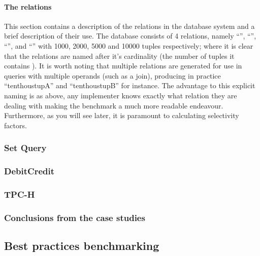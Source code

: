 \paragraph{The relations} This section contains a description of the relations in
the database system and a brief description of their use. The database consists
of 4 relations, namely ``'', ``'',
``'', and ``'' with 1000, 2000, 5000
and 10000 tuples respectively; where it is
clear that the relations are named after it's cardinality (the number of tuples
it contains \cite{PractitionersIntroduction}). It is worth noting that multiple
relations are generated for use in 
queries with multiple operands (such as a join), producing in practice
``tenthoustupA'' and ``tenthoustupB'' for instance. The advantage to this explicit
naming is as above, any implementer knows exactly what relation they are dealing
with making the benchmark a much more readable endeavour. Furthermore, as you will
see later, it is paramount to calculating selectivity factors.

\subsubsection{Set Query}
\subsubsection{DebitCredit}
\subsubsection{TPC-H}

\subsubsection{Conclusions from the case studies}

\subsection{Best practices benchmarking}
